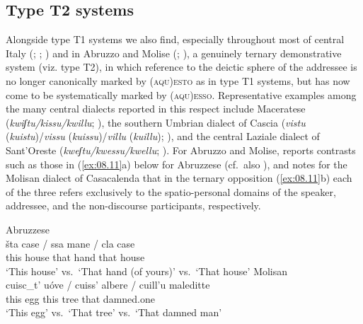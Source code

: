 \documentclass[output=paper]{langsci/langscibook}
\begin{document}
\subsection{Type T2 systems}

Alongside type T1 systems we also find, especially throughout most of central
Italy (\citealt[616]{Vignuzzi:1988a}; \citealt[315]{Vignuzzi:1997a};
\citealt[129]{Loporcaro:2009a}) and in Abruzzo and Molise
(\citealt[647]{Marinucci:1988a}; \citealt[161f]{Stavinschi:2009a}), a
genuinely ternary demonstrative system (viz. type T2), in which reference to
the deictic sphere of the addressee is no longer canonically marked by
\textsc{(aqu)esto} as in type T1 systems, but has now come to be systematically
marked by \textsc{(aqu)esso}. Representative examples among the many central
dialects reported in this respect include Maceratese
(\emph{kwiʃtu/kissu/kwillu}; \citealt[232]{Regnicoli:1995a}), the southern
Umbrian dialect of Cascia (\emph{vistu} (\emph{kuistu})/\emph{vissu}
(\emph{kuissu})/\emph{villu} (\emph{kuillu}); \citealt[123]{Moretti:1987a}),
and the central Laziale dialect of Sant’Oreste (\emph{kweʃtu/kwessu/kwellu};
\citealt[74]{Cimarra:1998a}). For Abruzzo and Molise,
\citet[22]{Finamore:1893a} reports contrasts such as those in
(\ref{ex:08.11}a) below for Abruzzese (cf.\ also
\citealt[47]{Verratti:1968a}), and \citet[75]{Vincelli:1995a} notes for the
Molisan dialect of Casacalenda that in the ternary opposition
(\ref{ex:08.11}b) each of the three  refers
exclusively to the spatio-personal domains of the speaker, addressee, and the
non-discourse participants, respectively.

\ea \label{bkm:Ref370498873}\label{ex:08.11}
    \ea Abruzzese \citep{Finamore:1893a}\\
    \gll šta  case  \textup{\quad /\quad}  ssa  mane  \textup{\quad /\quad} cla  case\\
            this  house  {}  that  hand  {}  that  house\\
        \glt \enquote*{This house} vs.\ \enquote*{That hand (of yours)} vs.\ \enquote*{That house}
    \ex Molisan \citep{Vincelli:1995a}\\
    \gll cuisc\_t’  uóve  \textup{\quad /\quad}  cuiss’  albere  \textup{\quad /\quad}  cuill’u  maleditte\\
            this  egg {} this  tree {} that  damned.one\\
    \glt    \enquote*{This egg} vs.\ \enquote*{That tree} vs.\ \enquote*{That
            damned man}
    \z
\z
\end{document}
